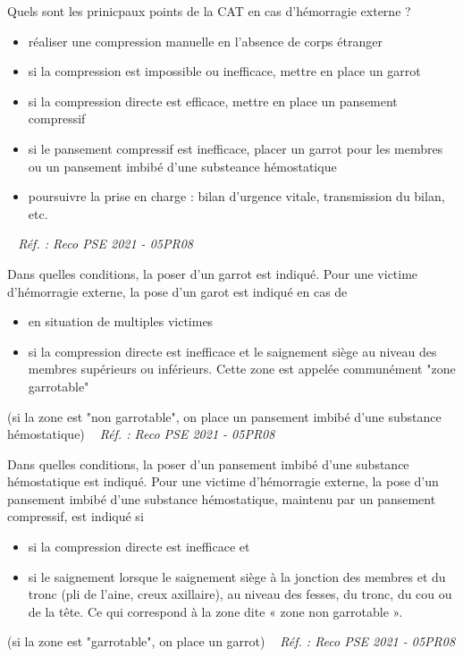 \documentclass[grid,avery5371,landscape]{flashcards}
\makeatletter
\newcounter{nocarte}
\newcommand{\categ}[1]{%
  \def\@categ{#1}%
  \setcounter{nocarte}{0}%
}
\newcommand{\source}[1]{%
  \medskip
  \itshape%
   ~ \hfill Réf. : #1}
\makeatother
\begin{document}
\color[HTML]{003273}
\categ{PSE}
\begin{flashcard}[CAT]{
 Quels sont les prinicpaux points de la CAT en cas d'hémorragie externe ?   }
  \begin{itemize}
\item réaliser une compression manuelle en l'absence de corps étranger 
\item si la compression est impossible ou inefficace, mettre en place un garrot
\item si la compression directe est efficace, mettre en place un pansement compressif
\item si le pansement compressif est inefficace, placer un garrot pour les membres ou un pansement imbibé d'une substeance hémostatique 
\item poursuivre la prise en charge : bilan d'urgence vitale, transmission du bilan, etc. 
\end{itemize}
  \source{Reco PSE 2021 - 05PR08}
\end{flashcard}


\color[HTML]{003273}
\categ{PSE}
\begin{flashcard}[CAT]{
 Dans quelles conditions, la poser d'un garrot est indiqué.   }
  Pour une victime d'hémorragie externe, la pose d'un garot est indiqué en cas de \begin{itemize} 
\item en situation de multiples victimes
\item si la compression directe est inefficace et le saignement siège au niveau des membres supérieurs ou inférieurs. Cette
zone est appelée communément "zone garrotable" 
\end{itemize}
(si la zone est "non garrotable", on place un pansement imbibé d'une substance hémostatique)
  \source{Reco PSE 2021 - 05PR08}
\end{flashcard}


\color[HTML]{003273}
\categ{PSE}
\begin{flashcard}[CAT]{
 Dans quelles conditions, la poser d'un pansement imbibé d'une substance hémostatique est indiqué.   }
  Pour une victime d'hémorragie externe, la pose d'un  pansement imbibé d'une substance hémostatique, maintenu par un pansement compressif, est indiqué si \begin{itemize} 
\item si la compression directe est inefficace et
\item si le saignement lorsque le saignement siège à la jonction des membres et du tronc (pli de l'aine, creux axillaire), au niveau des fesses, du tronc, du cou ou de la tête. Ce qui correspond à la zone dite « zone non garrotable ».
\end{itemize}
(si la zone est "garrotable", on place un garrot)
  \source{Reco PSE 2021 - 05PR08}
\end{flashcard}
\end{document}
